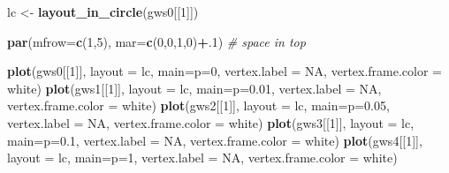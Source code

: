 \documentclass[
]{book}
\newenvironment{Shaded}{\begin{snugshade}}{\end{snugshade}}
\newcommand{\AttributeTok}[1]{\textcolor[rgb]{0.13,0.29,0.53}{#1}}
\newcommand{\CommentTok}[1]{\textcolor[rgb]{0.56,0.35,0.01}{\textit{#1}}}
\newcommand{\ConstantTok}[1]{\textcolor[rgb]{0.56,0.35,0.01}{#1}}
\newcommand{\DecValTok}[1]{\textcolor[rgb]{0.00,0.00,0.81}{#1}}
\newcommand{\FunctionTok}[1]{\textcolor[rgb]{0.13,0.29,0.53}{\textbf{#1}}}
\newcommand{\NormalTok}[1]{#1}
\newcommand{\OtherTok}[1]{\textcolor[rgb]{0.56,0.35,0.01}{#1}}
\newcommand{\SpecialCharTok}[1]{\textcolor[rgb]{0.81,0.36,0.00}{\textbf{#1}}}
\newcommand{\StringTok}[1]{\textcolor[rgb]{0.31,0.60,0.02}{#1}}
\begin{document}
\begin{Shaded}
\begin{Highlighting}[]
\NormalTok{lc }\OtherTok{\textless{}{-}} \FunctionTok{layout\_in\_circle}\NormalTok{(gws0[[}\DecValTok{1}\NormalTok{]])}

\FunctionTok{par}\NormalTok{(}\AttributeTok{mfrow=}\FunctionTok{c}\NormalTok{(}\DecValTok{1}\NormalTok{,}\DecValTok{5}\NormalTok{), }\AttributeTok{mar=}\FunctionTok{c}\NormalTok{(}\DecValTok{0}\NormalTok{,}\DecValTok{0}\NormalTok{,}\DecValTok{1}\NormalTok{,}\DecValTok{0}\NormalTok{)}\SpecialCharTok{+}\NormalTok{.}\DecValTok{1}\NormalTok{) }\CommentTok{\# space in top}

\FunctionTok{plot}\NormalTok{(gws0[[}\DecValTok{1}\NormalTok{]], }\AttributeTok{layout =}\NormalTok{ lc, }\AttributeTok{main=}\StringTok{\textquotesingle{}p=0\textquotesingle{}}\NormalTok{, }\AttributeTok{vertex.label =} \ConstantTok{NA}\NormalTok{, }\AttributeTok{vertex.frame.color =} \StringTok{\textquotesingle{}white\textquotesingle{}}\NormalTok{)}
\FunctionTok{plot}\NormalTok{(gws1[[}\DecValTok{1}\NormalTok{]], }\AttributeTok{layout =}\NormalTok{ lc, }\AttributeTok{main=}\StringTok{\textquotesingle{}p=0.01\textquotesingle{}}\NormalTok{, }\AttributeTok{vertex.label =} \ConstantTok{NA}\NormalTok{, }\AttributeTok{vertex.frame.color =} \StringTok{\textquotesingle{}white\textquotesingle{}}\NormalTok{)}
\FunctionTok{plot}\NormalTok{(gws2[[}\DecValTok{1}\NormalTok{]], }\AttributeTok{layout =}\NormalTok{ lc, }\AttributeTok{main=}\StringTok{\textquotesingle{}p=0.05\textquotesingle{}}\NormalTok{, }\AttributeTok{vertex.label =} \ConstantTok{NA}\NormalTok{, }\AttributeTok{vertex.frame.color =} \StringTok{\textquotesingle{}white\textquotesingle{}}\NormalTok{)}
\FunctionTok{plot}\NormalTok{(gws3[[}\DecValTok{1}\NormalTok{]], }\AttributeTok{layout =}\NormalTok{ lc, }\AttributeTok{main=}\StringTok{\textquotesingle{}p=0.1\textquotesingle{}}\NormalTok{, }\AttributeTok{vertex.label =} \ConstantTok{NA}\NormalTok{, }\AttributeTok{vertex.frame.color =} \StringTok{\textquotesingle{}white\textquotesingle{}}\NormalTok{)}
\FunctionTok{plot}\NormalTok{(gws4[[}\DecValTok{1}\NormalTok{]], }\AttributeTok{layout =}\NormalTok{ lc, }\AttributeTok{main=}\StringTok{\textquotesingle{}p=1\textquotesingle{}}\NormalTok{, }\AttributeTok{vertex.label =} \ConstantTok{NA}\NormalTok{, }\AttributeTok{vertex.frame.color =} \StringTok{\textquotesingle{}white\textquotesingle{}}\NormalTok{)}
\end{Highlighting}
\end{Shaded}
\end{document}
